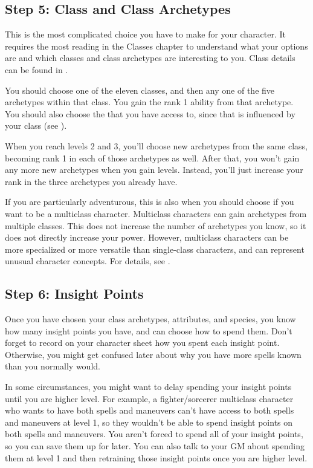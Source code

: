     \subsection{Step 5: Class and Class Archetypes}
        This is the most complicated choice you have to make for your character.
        It requires the most reading in the Classes chapter to understand what your options are and which classes and class archetypes are interesting to you.
        Class details can be found in .

        You should choose one of the eleven classes, and then any one of the five archetypes within that class.
        You gain the rank 1 ability from that archetype.
        You should also choose the  that you have access to, since that is influenced by your class (see ).

        When you reach levels 2 and 3, you'll choose new archetypes from the same class, becoming rank 1 in each of those archetypes as well.
        After that, you won't gain any more new archetypes when you gain levels.
        Instead, you'll just increase your rank in the three archetypes you already have.

        If you are particularly adventurous, this is also when you should choose if you want to be a multiclass character.
        Multiclass characters can gain archetypes from multiple classes.
        This does not increase the number of archetypes you know, so it does not directly increase your power.
        However, multiclass characters can be more specialized or more versatile than single-class characters, and can represent unusual character concepts.
        For details, see .

    \subsection{Step 6: Insight Points}
        Once you have chosen your class archetypes, attributes, and species, you know how many insight points you have, and can choose how to spend them.
        Don't forget to record on your character sheet how you spent each insight point.
        Otherwise, you might get confused later about why you have more spells known than you normally would.

        In some circumstances, you might want to delay spending your insight points until you are higher level.
        For example, a fighter/sorcerer multiclass character who wants to have both spells and maneuvers can't have access to both spells and maneuvers at level 1, so they wouldn't be able to spend insight points on both spells and maneuvers.
        You aren't forced to spend all of your insight points, so you can save them up for later.
        You can also talk to your GM about spending them at level 1 and then retraining those insight points once you are higher level.

